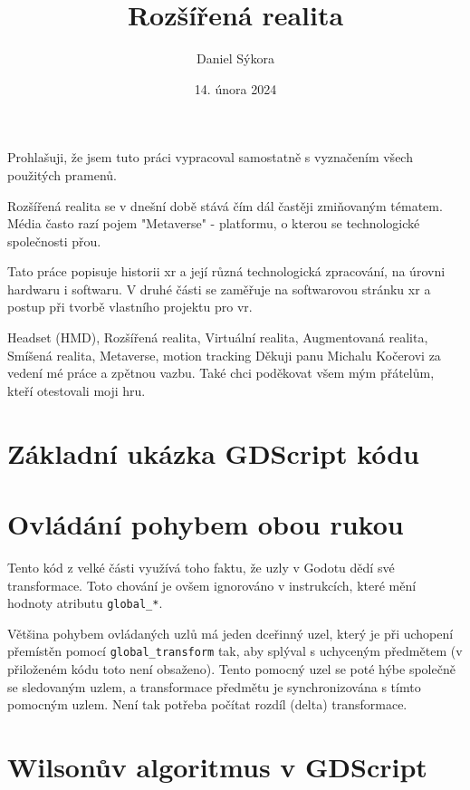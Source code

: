 \documentclass[12pt]{report}
\author{Daniel Sýkora}
\title{Rozšířená realita}
\date{14. února 2024}
\begin{document}
\mytitlepage
\prohlaseni
{
	Prohlašuji, že jsem tuto práci vypracoval samostatně s vyznačením všech použitých pramenů.
}
\abstrakt
{ %
	Rozšířená realita se v dnešní době stává čím dál častěji zmiňovaným tématem. Média často razí pojem "Metaverse" - platformu, o kterou se technologické společnosti přou.

	Tato práce popisuje historii \gls{xr} a její různá technologická zpracování, na úrovni hardwaru i softwaru. V druhé části se zaměřuje na softwarovou stránku \gls{xr} a postup při tvorbě vlastního projektu pro \gls{vr}.
}
{ %
	Headset (HMD), Rozšířená realita, Virtuální realita, Augmentovaná realita, Smíšená realita, Metaverse, motion tracking
}
\podekovani
{
	Děkuji panu Michalu Kočerovi za vedení mé práce a zpětnou vazbu. Také chci poděkovat všem mým přátelům, kteří otestovali moji hru.
}

\tableofcontents
\newpage






\nocite{*}

\printbibliography

\printglossary[title={Zkratky}]

\listoffigures
{}

\appendix

\chapter{Základní ukázka GDScript kódu}\label{apx_gscript_sample}


\chapter{Ovládání pohybem obou rukou}\label{apx_gripped_object_transformation}
Tento kód z velké části využívá toho faktu, že uzly v Godotu dědí své transformace. Toto chování je ovšem ignorováno v instrukcích, které mění hodnoty atributu \texttt{global\_*}.

Většina pohybem ovládaných uzlů má jeden dceřinný uzel, který je při uchopení přemístěn pomocí \texttt{global\_transform} tak, aby splýval s uchyceným předmětem (v přiloženém kódu toto není obsaženo). Tento pomocný uzel se poté hýbe společně se sledovaným uzlem, a transformace předmětu je synchronizována s tímto pomocným uzlem. Není tak potřeba počítat rozdíl (delta) transformace.



\chapter{Wilsonův algoritmus v GDScript}\label{apx_mazegen}

\end{document}
